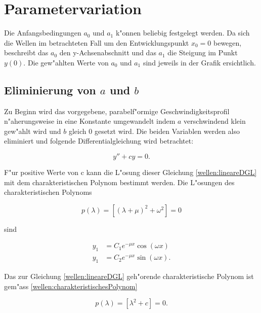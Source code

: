 \section{Parametervariation}

Die Anfangsbedingungen $a_0$ und $a_1$ k"onnen beliebig festgelegt werden. Da 
sich die Wellen im betrachteten Fall um den Entwicklungspunkt $x_0=0$ bewegen, 
beschreibt das $a_0$ den y-Achsenabschnitt und das $a_1$ die Steigung im Punkt 
$y(0)$. Die gew"ahlten Werte von $a_0$ und $a_1$ sind jeweils in der Grafik 
ersichtlich.

\subsection{Eliminierung von $a$ und $b$}
\label{wellen:Eliminierungab}

Zu Beginn wird das vorgegebene, parabelf"ormige Geschwindigkeitsprofil 
n"aherungsweise in eine Konstante umgewandelt indem $a$ verschwindend klein 
gew"ahlt wird und $b$ gleich $0$ gesetzt wird. Die beiden Variablen werden also 
eliminiert und folgende Differentialgleichung wird betrachtet:

\begin{equation}
	y''+ cy = 0.
	\label{wellen:lineareDGL}
\end{equation}


F"ur positive Werte von c kann die L"osung dieser Gleichung 
\ref{wellen:lineareDGL} mit dem charakteristischen Polynom bestimmt werden. 
Die L"osungen des charakteristischen Polynoms

\begin{equation}
	p(\lambda) = [(\lambda+\mu)^2+\omega^2] =0
	\label{wellen:charakteristischesPolynom}
\end{equation}

sind

\begin{equation}
	\begin{split}
	y_1 &= C_1e^{-\mu x}\cos(\omega x) \\
	y_1 &= C_2e^{-\mu x}\sin(\omega x).
	\end{split}
	\label{wellen:lsgcharakteristischesPolynom}
\end{equation}

Das zur Gleichung \ref{wellen:lineareDGL} geh"orende charakteristische Polynom 
ist gem"ass \ref{wellen:charakteristischesPolynom}

\begin{equation*}
	p(\lambda) = [\lambda^2 + c] =0.
\end{equation*}

